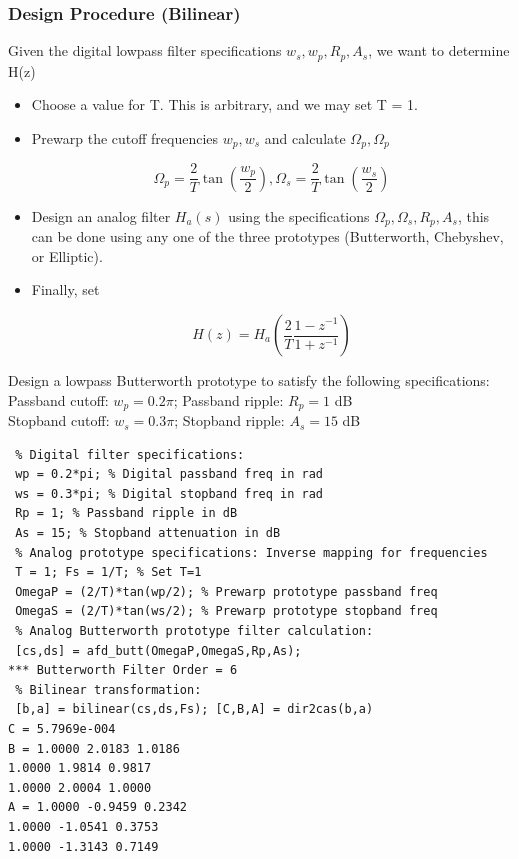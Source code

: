 \documentclass{article}
\begin{document}
\subsubsection{Design Procedure (Bilinear)}
Given the digital lowpass filter specifications $w_s, w_p, R_p, A_s$, we want to determine H(z)
\begin{itemize}
    \item  Choose a value for T. This is arbitrary, and we may set T = 1.
    \item Prewarp the cutoff frequencies $w_p, w_s$ and calculate $\Omega_p, \Omega_p$
    \begin{center}
    $$\Omega_p=\frac{2}{T}\tan(\frac{w_p}{2}), \Omega_s=\frac{2}{T}\tan(\frac{w_s}{2})$$
    \end{center}
    \item Design an analog filter $H_a(s)$ using the specifications $\Omega_p, \Omega_s, R_p, A_s$, this can be done using any one of the three prototypes (Butterworth, Chebyshev, or Elliptic).
    \item Finally, set 
    \begin{center}
        $$H(z)= H_a(\frac{2}{T}\frac{1-z^{-1}}{1+z^{-1}})$$
    \end{center}
\end{itemize}
Design a lowpass Butterworth prototype to satisfy the following specifications: \\
\vspace{1em}
Passband cutoff: $w_p=0.2\pi$; Passband ripple: $R_p=1$ dB \\
\vspace{1em}
Stopband cutoff: $w_s=0.3\pi$; Stopband ripple: $A_s =15$ dB \\
\vspace{1em}
\begin{lstlisting}
 % Digital filter specifications:
 wp = 0.2*pi; % Digital passband freq in rad
 ws = 0.3*pi; % Digital stopband freq in rad
 Rp = 1; % Passband ripple in dB
 As = 15; % Stopband attenuation in dB
 % Analog prototype specifications: Inverse mapping for frequencies
 T = 1; Fs = 1/T; % Set T=1
 OmegaP = (2/T)*tan(wp/2); % Prewarp prototype passband freq
 OmegaS = (2/T)*tan(ws/2); % Prewarp prototype stopband freq
 % Analog Butterworth prototype filter calculation:
 [cs,ds] = afd_butt(OmegaP,OmegaS,Rp,As);
*** Butterworth Filter Order = 6
 % Bilinear transformation:
 [b,a] = bilinear(cs,ds,Fs); [C,B,A] = dir2cas(b,a)
C = 5.7969e-004
B = 1.0000 2.0183 1.0186
1.0000 1.9814 0.9817
1.0000 2.0004 1.0000
A = 1.0000 -0.9459 0.2342
1.0000 -1.0541 0.3753
1.0000 -1.3143 0.7149    
\end{lstlisting}
\end{document}
